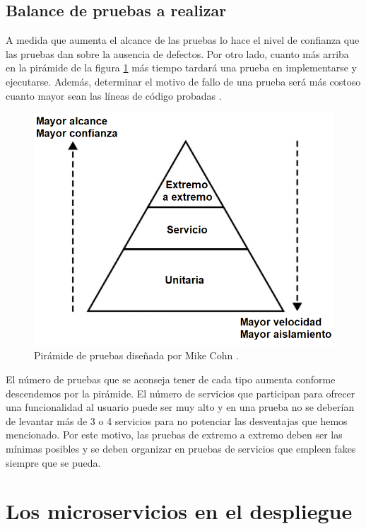 \documentclass[11pt,spanish,listoffigures]{tfgetsinf}
\begin{document}
\subsection{Balance de pruebas a realizar}

A medida que aumenta el alcance de las pruebas lo hace el nivel de confianza que las pruebas dan sobre la ausencia de defectos. Por otro lado, cuanto más arriba en la pirámide de la figura \ref{fig:Cohn_Pyramid_ES} más tiempo tardará una prueba en implementarse y ejecutarse. Además, determinar el motivo de fallo de una prueba será más costoso cuanto mayor sean las líneas de código probadas \cite{Cohn2010}.

\begin{figure}[h]
\centering
\includegraphics[scale=0.5]{Cohn_Pyramid_ES}
\caption{Pirámide de pruebas diseñada por Mike Cohn \cite{Cohn2010}.}
\label{fig:Cohn_Pyramid_ES}
\end{figure}

El número de pruebas que se aconseja tener de cada tipo aumenta conforme descendemos por la pirámide. El número de servicios que participan para ofrecer una funcionalidad al usuario puede ser muy alto y en una prueba no se deberían de levantar más de 3 o 4 servicios para no potenciar las desventajas que hemos mencionado. Por este motivo, las pruebas de extremo a extremo deben ser las mínimas posibles y se deben organizar en pruebas de servicios que empleen fakes siempre que se pueda.

\section{Los microservicios en el despliegue}
\end{document}
